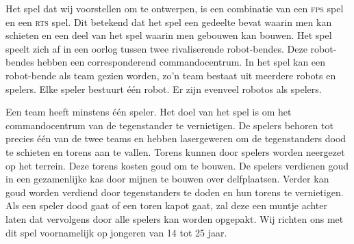 Het spel dat wij voorstellen om te ontwerpen, is een combinatie van een \textsc{fps} spel en een \textsc{rts} spel. Dit betekend dat het spel een gedeelte bevat waarin men kan schieten en een deel van het spel waarin men gebouwen kan bouwen. Het spel speelt zich af in een oorlog tussen twee rivaliserende robot-bendes. Deze robot-bendes hebben een corresponderend commandocentrum. In het spel kan een robot-bende als team gezien worden, zo'n team bestaat uit meerdere robots en spelers. Elke speler bestuurt \'e\'en robot. Er zijn evenveel robotos als spelers. 

Een team heeft minstens \'e\'en speler. Het doel van het spel is om het commandocentrum van de tegenstander te vernietigen. De spelers behoren tot precies \'e\'en van de twee teams en hebben lasergeweren om de tegenstanders dood te schieten en torens aan te vallen. Torens kunnen door spelers worden neergezet op het terrein. Deze torens kosten goud om te bouwen. De spelers verdienen goud in een gezamenlijke kas door mijnen te bouwen over delfplaatsen. Verder kan goud worden verdiend door tegenstanders te doden en hun torens te vernietigen. Als een speler dood gaat of een toren kapot gaat, zal deze een muntje achter laten dat vervolgens door alle spelers kan worden opgepakt. Wij richten ons met dit spel voornamelijk op jongeren van 14 tot 25 jaar.

